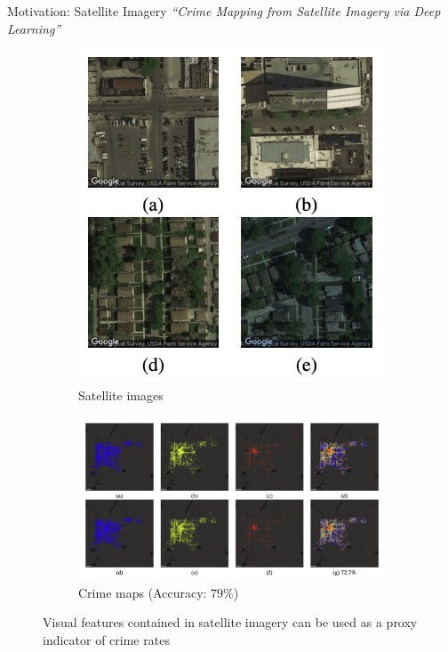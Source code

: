 \documentclass[10pt]{beamer}
\begin{document}
\begin{frame}{Motivation: Satellite Imagery}
\emph{``Crime Mapping from Satellite Imagery via Deep Learning'' \citep{najjar2018crime}}
\begin{figure}
\centering
\begin{subfigure}{.4\textwidth}
  \centering
  \includegraphics[width=0.75\linewidth]{Satellite_Images.png}
  \caption{Satellite images}
  \label{fig:sub1}
\end{subfigure}%
\begin{subfigure}{.6\textwidth}
  \centering
  \includegraphics[width=1\linewidth]{Crime_Maps.png}
  \caption{Crime maps (Accuracy: $79\%$)}
  \label{fig:sub2}
\end{subfigure}
\caption{Visual features contained in satellite imagery can be used as a proxy indicator
of crime rates}
\label{fig:test}
\end{figure}
\end{frame}
\end{document}
